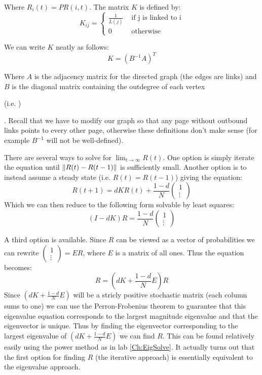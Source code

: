 Where $R_i(t) = PR(i,t)$. The matrix $K$ is defined by:
\[
K_{ij} = \begin{cases} \frac{1}{L(j)} & \mbox{ if j is linked to i} \\ 0 & \mbox{ otherwise} \end{cases}
\]

We can write $K$ neatly as follows:
\[
K = (B^{-1}A)^T
\]

Where $A$ is the adjacency matrix for the directed graph (the edges are links) and $B$ is the diagonal matrix containing the outdegree of each vertex\begin{matlab} (i.e. )\end{matlab}. Recall that we have to modify our graph so that any page without outbound links points to every other page, otherwise these definitions don't make sense (for example $B^{-1}$ will not be well-defined).

There are several ways to solve for $\lim_{t \to \infty} R(t)$. One option is simply iterate the equation until $\lVert R(t)-R(t-1)\rVert$ is sufficiently small. Another option is to instead assume a steady state (i.e. $R(t) = R(t-1)$) giving the equation:
\[
R(t+1) = d K R(t) + \frac{1-d}{N} \begin{pmatrix}1\\\vdots\end{pmatrix}
\]
Which we can then reduce to the following form solvable by least squares:
\[
(I-dK)R = \frac{1-d}{N} \begin{pmatrix}1\\\vdots\end{pmatrix}
\]

A third option is available. Since $R$ can be viewed as a vector of probabilities we can rewrite $\left(\begin{smallmatrix}1\\\vdots\end{smallmatrix}\right) = E R$, where $E$ is a matrix of all ones. Thus the equation becomes:
\[
R = (dK + \frac{1-d}{N}E)R
\]
Since $(dK + \frac{1-d}{N}E)$ will be a stricly positive stochastic matrix (each column sums to one) we can use the Perron-Frobenius theorem to guarantee that this eigenvalue equation corresponds to the largest magnitude eigenvalue and that the eigenvector is unique. Thus by finding the eigenvector corresponding to the largest eigenvalue of $(dK + \frac{1-d}{N}E)$ we can find $R$. This can be found relatively easily using the power method as in lab \ref{Ch:EigSolve}. It actually turns out that the first option for finding $R$ (the iterative approach) is essentially equivalent to the eigenvalue approach.

